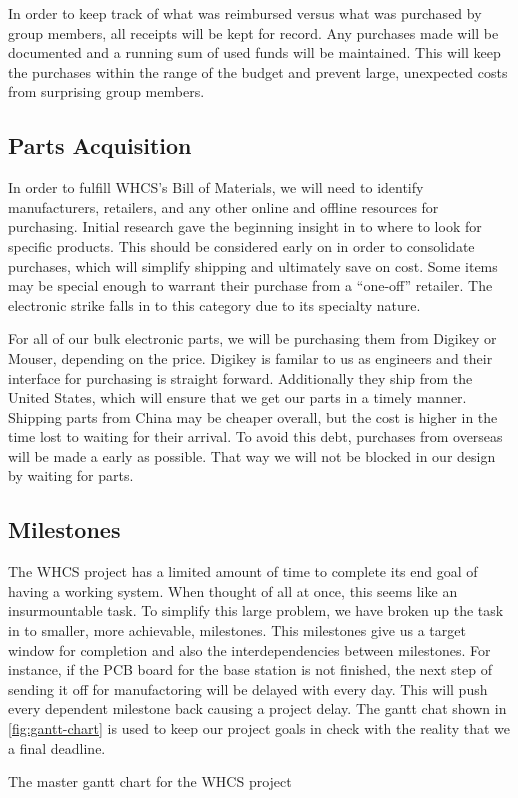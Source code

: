 In order to keep track of what was reimbursed versus what was purchased by
group members, all receipts will be kept for record. Any purchases made will be
documented and a running sum of used funds will be maintained. This will keep
the purchases within the range of the budget and prevent large, unexpected
costs from surprising group members.

\subsection{Parts Acquisition}
In order to fulfill WHCS's Bill of Materials, we will need to identify
manufacturers, retailers, and any other online and offline resources for
purchasing. Initial research gave the beginning insight in to where to look for
specific products. This should be considered early on in order to consolidate
purchases, which will simplify shipping and ultimately save on cost. Some items
may be special enough to warrant their purchase from a ``one-off'' retailer.
The electronic strike falls in to this category due to its specialty nature.

For all of our bulk electronic parts, we will be purchasing them from Digikey
or Mouser, depending on the price. Digikey is familar to us as engineers and
their interface for purchasing is straight forward. Additionally they ship from
the United States, which will ensure that we get our parts in a timely manner.
Shipping parts from China may be cheaper overall, but the cost is higher in the
time lost to waiting for their arrival. To avoid this debt, purchases from
overseas will be made a early as possible. That way we will not be blocked in
our design by waiting for parts.

\subsection{Milestones}
The WHCS project has a limited amount of time to complete its end goal of
having a working system. When thought of all at once, this seems like an
insurmountable task. To simplify this large problem, we have broken up the task
in to smaller, more achievable, milestones. This milestones give us a target
window for completion and also the interdependencies between milestones. For
instance, if the PCB board for the base station is not finished, the next step
of sending it off for manufactoring will be delayed with every day. This will
push every dependent milestone back causing a project delay. The gantt chat
shown in \autoref{fig:gantt-chart} is used to keep our project goals in check
with the reality that we a final deadline.

{The master gantt chart for the WHCS project}

